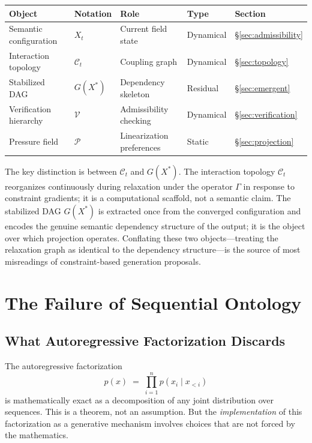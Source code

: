 \documentclass[11pt, a4paper]{article}
\theoremstyle{srn}
\theoremstyle{srnremark}
\newcommand{\Cstruct}{\mathcal{C}}           %
\newcommand{\Gop}{\Gamma}              %
\begin{document}
\begin{center}
\renewcommand{\arraystretch}{1.3}
\begin{tabular}{lllll}
\hline
\textbf{Object} & \textbf{Notation} & \textbf{Role} &
\textbf{Type} & \textbf{Section} \\
\hline
Semantic configuration & $X_t$ &
  Current field state & Dynamical & \S\ref{sec:admissibility} \\
Interaction topology & $\Cstruct_t$ &
  Coupling graph & Dynamical & \S\ref{sec:topology} \\
Stabilized DAG & $G(X^*)$ &
  Dependency skeleton & Residual & \S\ref{sec:emergent} \\
Verification hierarchy & $\mathcal{V}$ &
  Admissibility checking & Dynamical & \S\ref{sec:verification} \\
Pressure field & $\mathcal{P}$ &
  Linearization preferences & Static & \S\ref{sec:projection} \\
\hline
\end{tabular}
\end{center}

\medskip
\noindent
The key distinction is between $\Cstruct_t$ and $G(X^*)$.
The interaction topology $\Cstruct_t$ reorganizes continuously during
relaxation under the operator $\Gop$ in response to constraint
gradients; it is a computational scaffold, not a semantic claim.
The stabilized DAG $G(X^*)$ is extracted once from the converged
configuration and encodes the genuine semantic dependency structure of
the output; it is the object over which projection operates.
Conflating these two objects---treating the relaxation graph as
identical to the dependency structure---is the source of most
misreadings of constraint-based generation proposals.

\section{The Failure of Sequential Ontology}
\label{sec:failure}

\subsection{What Autoregressive Factorization Discards}

The autoregressive factorization
\[
  p(x) \;=\; \prod_{i=1}^n p(x_i \mid x_{<i})
\]
is mathematically exact as a decomposition of any joint distribution
over sequences.
This is a theorem, not an assumption.
But the \emph{implementation} of this factorization as a generative
mechanism involves choices that are not forced by the mathematics.
\end{document}
